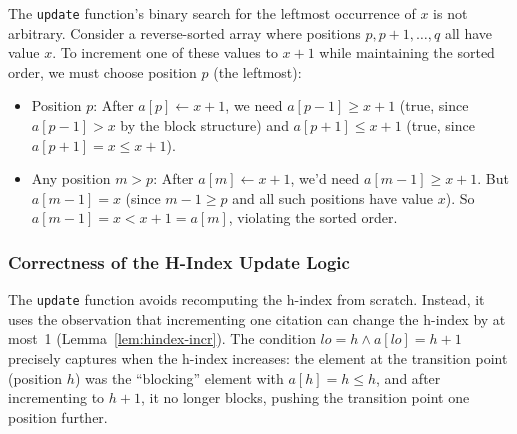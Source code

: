 The \texttt{update} function's binary search for the leftmost occurrence of $x$
is not arbitrary. Consider a reverse-sorted array where positions
$p, p{+}1, \ldots, q$ all have value $x$. To increment one of these values to
$x+1$ while maintaining the sorted order, we must choose position $p$ (the leftmost):
\begin{itemize}
  \item Position $p$: After $a[p] \gets x+1$, we need $a[p{-}1] \geq x+1$ (true,
    since $a[p{-}1] > x$ by the block structure) and $a[p{+}1] \leq x+1$
    (true, since $a[p{+}1] = x \leq x+1$).
  \item Any position $m > p$: After $a[m] \gets x+1$, we'd need $a[m{-}1] \geq x+1$.
    But $a[m{-}1] = x$ (since $m{-}1 \geq p$ and all such positions have value $x$).
    So $a[m{-}1] = x < x+1 = a[m]$, violating the sorted order.
\end{itemize}

\subsubsection{Correctness of the H-Index Update Logic}

The \texttt{update} function avoids recomputing the h-index from scratch.
Instead, it uses the observation that incrementing one citation can change
the h-index by at most~1 (Lemma~\ref{lem:hindex-incr}). The condition
$\mathit{lo} = h \wedge a[\mathit{lo}] = h + 1$ precisely captures when the
h-index increases: the element at the transition point (position $h$) was the
``blocking'' element with $a[h] = h \leq h$, and after incrementing to $h+1$,
it no longer blocks, pushing the transition point one position further.
